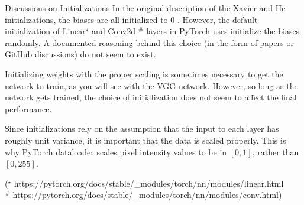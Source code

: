 \begin{frame}[allowframebreaks]

\begin{myconceptblock}{6.35}{Discussions on Initializations}
    In the original description of the Xavier and He initializations, the biases are all initialized to 0 . However, the default initialization of Linear${ }^{\star}$ and Conv2d ${ }^{\#}$ layers in PyTorch uses initialize the biases randomly. A documented reasoning behind this choice (in the form of papers or GitHub discussions) do not seem to exist.

    Initializing weights with the proper scaling is sometimes necessary to get the network to train, as you will see with the VGG network. However, so long as the network gets trained, the choice of initialization does not seem to affect the final performance.

    Since initializations rely on the assumption that the input to each layer has roughly unit variance, it is important that the data is scaled properly. This is why PyTorch dataloader scales pixel intensity values to be in $[0,1]$, rather than $[0,255]$.

    (${ }^{\star}$ https://pytorch.org/docs/stable/_modules/torch/nn/modules/linear.html\\
    ${ }^{\#}$ https://pytorch.org/docs/stable/_modules/torch/nn/modules/conv.html)
\end{myconceptblock}

\end{frame}

